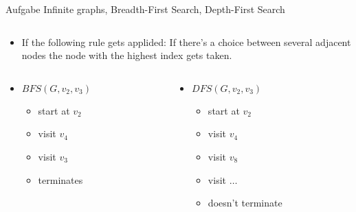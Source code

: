 \begin{frame}[allowframebreaks]{Aufgabe \thesection}{Infinite graphs, Breadth-First Search, Depth-First Search}
\begin{solutionnoinc}
\begin{columns}
\begin{column}[t]{0.5\textwidth}
{\begin{minipage}{\textwidth}
            \vspace{0.25cm}
            \begin{itemize}
              \item \alert{If the following rule gets applided:} If there's a choice between several adjacent nodes the node with the highest index gets taken.
            \end{itemize}
            \begin{columns}
              \begin{column}[t]{0.5\linewidth}
                \begin{itemize}
                  \item $BFS(G,v_2, v_3)$
                  \begin{itemize}
                    \item start at $v_2$
                    \item visit $v_4$
                    \item visit $v_3$
                    \item terminates
                  \end{itemize}
                \end{itemize}
              \end{column}
              \begin{column}[t]{0.5\linewidth}
                \begin{itemize}
                  \item $DFS(G, v_2, v_3)$
                  \begin{itemize}
                    \item start at $v_2$
                    \item visit $v_4$
                    \item visit $v_8$
                    \item visit $\ldots$
                    \item doesn't terminate
                  \end{itemize}
                \end{itemize}
              \end{column}
            \end{columns}

          \end{minipage}
        }
      \end{column}
    \end{columns}
  \end{solutionnoinc}
\end{frame}
